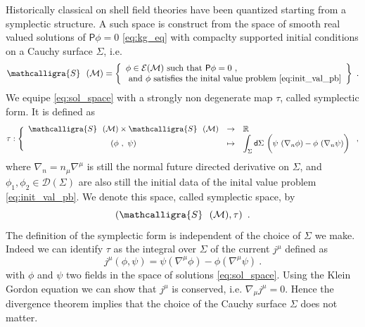 \documentclass[11pt]{book}
\newcommand{\bigint}{\displaystyle\int}
\newcommand{\Dcal}{\mathcal{D}}
\newcommand{\Ecal}{\mathcal{E}}
\newcommand{\Mcal}{\mathcal{M}}
\newcommand{\Rbb}{\mathbb{R}}
\newcommand{\Psf}{\mathsf{P}}
\newcommand{\dsf}{\mathsf{d}}
\theoremstyle{break}
\begin{document}
Historically classical on shell field theories have been quantized starting from a symplectic structure. A such space is construct from the space of smooth real valued solutions of $\Psf \phi = 0$ \eqref{eq:kg_eq} with compaclty supported initial conditions on a Cauchy surface $\Sigma$, i.e.
%
\begin{equation}
\mathcalligra{S} \ \ (\Mcal) = \left\{ 
\begin{array}{l}
\phi \in \Ecal(\Mcal) \mbox{ such that } \Psf\phi=0 \ , \\
\mbox{ and } \phi \mbox{ satisfies the inital value problem } \eqref{eq:init_val_pb} 
\end{array}
\right\} \ .
\label{eq:sol_space}
\end{equation}
%
We equipe \eqref{eq:sol_space} with a strongly non degenerate map $\tau$, called symplectic form. It is defined as
%
\begin{equation*}
\tau : \Bigg\{
\begin{array}{ccl}
\mathcalligra{S} \ \ (\Mcal) \times \mathcalligra{S} \ \ (\Mcal) & \to & \Rbb \\
(\phi \ , \ \psi) & \mapsto & \bigint_\Sigma  \dsf \Sigma \ \bigg( \psi \ (\nabla_n \phi) - \phi \ (\nabla_n \psi) \bigg)
\end{array}
\ ,
\end{equation*}
%
where $\nabla_n = n_\mu \nabla^\mu$ is still the normal future directed derivative on $\Sigma$, and $\phi_1, \phi_2 \in \Dcal(\Sigma)$  are also still the initial data of the inital value problem \eqref{eq:init_val_pb}. We denote this space, called symplectic space, by 
%
\begin{equation*}
\left(\mathcalligra{S} \ \ (\Mcal),\tau\right) \ . 
\end{equation*}
%
The definition of the symplectic form is independent of the choice of $\Sigma$ we make. Indeed we can identify $\tau$ as the integral over $\Sigma$ of the current $j^\mu$ defined as
%
\begin{equation*}
j^\mu (\phi,\psi) = \psi (\nabla^\mu \phi) - \phi (\nabla^\mu \psi) \ . 
\label{eq:current}
\end{equation*}
%
with $\phi$ and $\psi$ two fields in the space of solutions \eqref{eq:sol_space}. Using the Klein Gordon equation we can show that $j^\mu$ is conserved, i.e. $\nabla_\mu j^\mu = 0$. Hence the divergence theorem implies that the choice of the Cauchy surface $\Sigma$ does not matter. 



\bigskip
\end{document}
